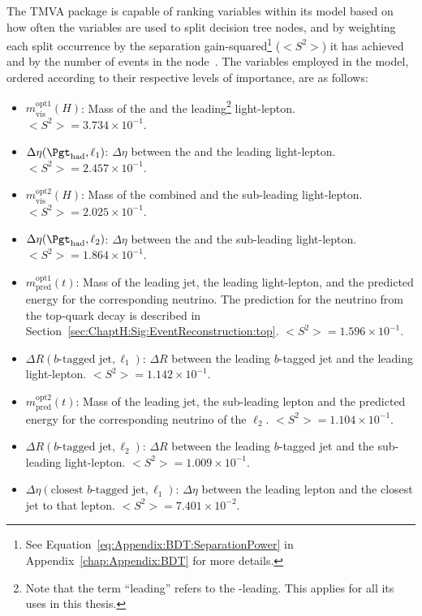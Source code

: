The TMVA package is capable of ranking variables within its model based on how often the 
variables are used to split decision tree nodes, and by weighting each split occurrence by 
the separation gain-squared\footnote{See Equation~\ref{eq:Appendix:BDT:SeparationPower} 
in Appendix~\ref{chap:Appendix:BDT} for more details.}
 ($<S^{2}>$) it has achieved and by the number of events in the node~\cite{Breiman1984ClassificationAR}.
The variables employed in the model, ordered according to their respective levels of importance, are as follows:
\begin{itemize}
   	\item $m^{\text{opt1}}_{\text{vis}}(H)$: Mass of the \tauhad and the 
		leading\footnote{Note that the term ``leading'' refers to the \pT-leading. This applies for all its uses in this thesis.} light-lepton. %
		 \mbox{$<S^{2}> = 3.734 \times 10^{-1}$.}
   	\item $\Delta \eta(\tauhad, \ell_{1})$: $\Delta \eta$ between the 
		\tauhad and the leading light-lepton. %
		 \mbox{$<S^{2}> = 2.457 \times 10^{-1}$.}
    	\item $m^{\text{opt2}}_{\text{vis}}(H)$: Mass of the combined \tauhad and 
		the sub-leading light-lepton. %
		 \mbox{$<S^{2}> = 2.025 \times 10^{-1}$.}
   	\item $\Delta \eta(\tauhad, \ell_{2})$: $\Delta \eta$ between the 
		\tauhad and the sub-leading light-lepton. %
		 \mbox{$<S^{2}> = 1.864 \times 10^{-1}$.}
    	\item $m^{\text{opt1}}_{\text{pred}}(t)$: Mass of the leading \btagged jet, the leading light-lepton, and the predicted energy for the corresponding neutrino. 
	The prediction for the neutrino from the top-quark decay is 
	described in Section~\ref{sec:ChaptH:Sig:EventReconstruction:top}. %
		 \mbox{$<S^{2}> = 1.596 \times 10^{-1}$.}
    	\item $\Delta R(b\text{-tagged jet}, \ell_{1})$: $\Delta R$ between the leading
		$b$-tagged jet and the leading light-lepton. %
		 \mbox{$<S^{2}> = 1.142 \times 10^{-1}$.}
    	\item $m^{\text{opt2}}_{\text{pred}}(t)$: Mass of the leading \btagged jet, the sub-leading lepton and the predicted energy for the corresponding neutrino of the $\ell_{2}$. %
		 \mbox{$<S^{2}> = 1.104 \times 10^{-1}$.}
	\item $\Delta R(b\text{-tagged jet}, \ell_{2})$: $\Delta R$ between the  leading
		$b$-tagged jet and the sub-leading light-lepton.%
		 \mbox{$<S^{2}> = 1.009 \times 10^{-1}$.}
    	\item $\Delta \eta(\text{closest }b\text{-tagged jet}, \ell_{1})$: 
		$\Delta \eta$ between the leading lepton and the closest \btagged 
		jet to that lepton.%
		 \mbox{$<S^{2}> = 7.401 \times 10^{-2}$.}
\end{itemize}
